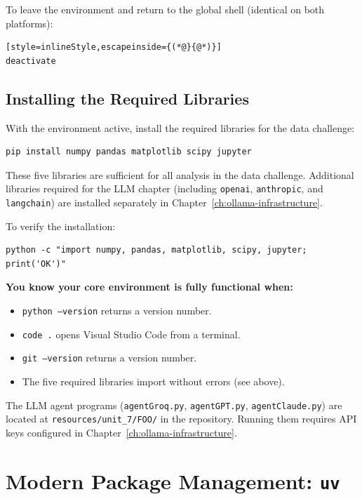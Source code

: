 To leave the environment and return to the global shell (identical on
both platforms):

\begin{lstlisting}[style=inlineStyle,escapeinside={(*@}{@*)}]
deactivate
\end{lstlisting}

\subsection{Installing the \ProjectName{} Required Libraries}
\label{sec:project-libraries}

With the \ProjectName{} environment active, install the required libraries for
the data challenge:

\begin{verbatim}
pip install numpy pandas matplotlib scipy jupyter
\end{verbatim}

These five libraries are sufficient for all analysis in the data
challenge. Additional libraries required for the LLM chapter (including
\texttt{openai}, \texttt{anthropic}, and \texttt{langchain}) are
installed separately in Chapter~\ref{ch:ollama-infrastructure}.

\vs
\noindent
To verify the installation:

\begin{verbatim}
python -c "import numpy, pandas, matplotlib, scipy, jupyter; print('OK')"
\end{verbatim}

\vs
\noindent
\textbf{You know your core environment is fully functional when:}
\begin{itemize}
    \item \texttt{python --version} returns a version number.
    \item \texttt{code .} opens Visual Studio Code from a terminal.
    \item \texttt{git --version} returns a version number.
    \item The five required libraries import without errors (see above).
\end{itemize}
The LLM agent programs (\texttt{agentGroq.py}, \texttt{agentGPT.py},
\texttt{agentClaude.py}) are located at
\texttt{resources/unit\_7/FOO/} in the \ProjectName{} repository.
Running them requires API keys configured in
Chapter~\ref{ch:ollama-infrastructure}.
\vs

\section{Modern Package Management: \texttt{uv}}
\label{sec:uv}

